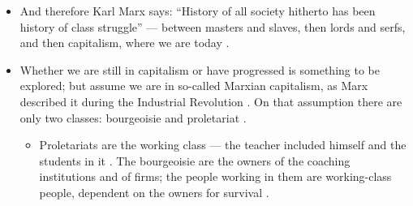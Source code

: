 \begin{itemize}
    \item And therefore Karl Marx says: ``History of all society hitherto has been history of class struggle'' --- between masters and slaves, then lords and serfs, and then capitalism, where we are today .
    \item Whether we are still in capitalism or have progressed is something to be explored; but assume we are in so-called Marxian capitalism, as Marx described it during the Industrial Revolution . On that assumption there are only two classes: bourgeoisie and proletariat .
    \begin{itemize}
        \item Proletariats are the working class --- the teacher included himself and the students in it . The bourgeoisie are the owners of the coaching institutions and of firms; the people working in them are working-class people, dependent on the owners for survival .
    \end{itemize}
\end{itemize}


